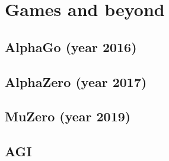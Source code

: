 \chapter{Games and beyond}
\label{chap:games}


\section{AlphaGo (year 2016)}



\section{AlphaZero (year 2017)}



\section{MuZero (year 2019)}



\section{AGI}



